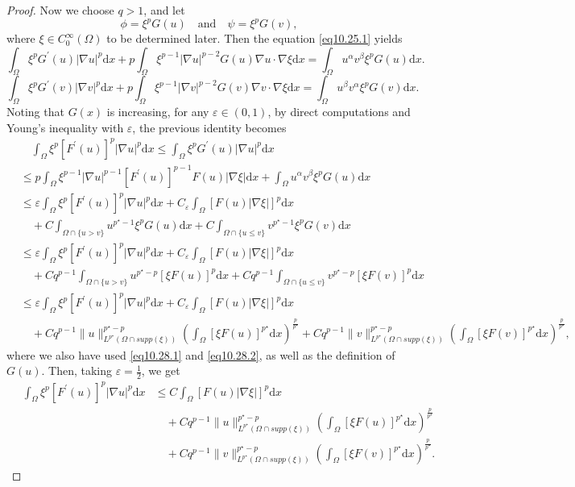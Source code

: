 \documentclass[12pt]{amsart}
\theoremstyle{definition}
\theoremstyle{remark}
\theoremstyle{conclusion}
\theoremstyle{conjecture}
\numberwithin{equation}{section}
\begin{document}
\begin{proof}
Now we choose $q>1$, %
and let
$$\phi=\xi^p G(u) \quad \text{and} \quad \psi=\xi^p G(v), $$
where $\xi \in C^\infty_0 (\Omega)$ to be determined later. Then the equation \eqref{eq10.25.1} yields
$$ \int_{\Omega} \xi^p G^\prime(u) |\nabla u|^p \mathrm{d}x + p\int_{\Omega} \xi^{p-1}| \nabla u|^{p-2} G(u) \nabla u \cdot \nabla \xi \mathrm{d}x = \int_{\Omega} u^{\alpha}v^{\beta} \xi^p G(u) \mathrm{d}x.$$
$$ \int_{\Omega} \xi^p G^\prime(v) |\nabla v|^p \mathrm{d}x + p\int_{\Omega} \xi^{p-1}| \nabla v|^{p-2} G(v) \nabla v \cdot \nabla \xi \mathrm{d}x = \int_{\Omega} u^{\beta}v^{\alpha} \xi^p G(v) \mathrm{d}x.$$
Noting that $G(x)$ is increasing, for any $\varepsilon\in(0,1)$, by direct computations and Young's inequality with $\varepsilon$, the previous identity becomes
\begin{align*}
&\quad \int_{\Omega} \xi^p [F^\prime(u)]^p |\nabla u|^p \mathrm{d}x \leq \int_{\Omega} \xi^p G^\prime(u) |\nabla u|^p \mathrm{d}x \\
&\leq p \int_{\Omega} \xi^{p-1}| \nabla u|^{p-1} [F^\prime(u)]^{p-1} F(u) |\nabla \xi| \mathrm{d}x + \int_{\Omega} u^{\alpha}v^{\beta} \xi^p G(u) \mathrm{d}x \\
&\leq \varepsilon \int_{\Omega} \xi^p [F^\prime(u)]^p |\nabla u|^p \mathrm{d}x + C_\varepsilon \int_{\Omega}  [F(u) |\nabla \xi|]^p \mathrm{d}x\\
&\quad + C \int_{\Omega \cap \{u> v\}} u^{p^{\star}-1} \xi^p G(u)\mathrm{d}x + C \int_{\Omega \cap \{u\leq v\}} v^{p^\star-1} \xi^p G(v) \mathrm{d}x\\
&\leq \varepsilon \int_{\Omega} \xi^p [F^\prime(u)]^p |\nabla u|^p \mathrm{d}x + C_\varepsilon \int_{\Omega}  [F(u) |\nabla \xi|]^p \mathrm{d}x\\
&\quad + Cq^{p-1} \int_{\Omega \cap \{u> v\}} u^{p^{\star}-p} [\xi F(u)]^p\mathrm{d}x + Cq^{p-1} \int_{\Omega \cap \{u\leq v\}} v^{p^\star-p}  [\xi F(v)]^p \mathrm{d}x\\
&\leq \varepsilon \int_{\Omega} \xi^p [F^\prime(u)]^p |\nabla u|^p \mathrm{d}x +  C_\varepsilon \int_{\Omega}  [F(u) |\nabla \xi|]^p \mathrm{d}x\\
&\quad+ Cq^{p-1}\|u\|_{L^{p^{\star}}(\Omega\cap supp(\xi))}^{p^{\star}-p}\left(\int_{\Omega} [\xi F(u)]^{p^{\star}} \mathrm{d}x\right)^\frac{p}{p^{\star}}+Cq^{p-1}\|v\|_{L^{p^{\star}}(\Omega\cap supp(\xi))}^{p^{\star}-p} \left(\int_{\Omega} [\xi F(v)]^{p^{\star}} \mathrm{d}x\right)^\frac{p}{p^{\star}},
\end{align*}
where we also have used \eqref{eq10.28.1} and \eqref{eq10.28.2}, as well as the definition of $G(u)$. Then, taking $\varepsilon=\frac{1}{2}$, we get
\begin{align*}
\quad \int_{\Omega} \xi^p  [F^\prime(u)]^p |\nabla u|^p \mathrm{d}x &\leq C \int_{\Omega}  [F(u) |\nabla \xi|]^p \mathrm{d}x\\
& \quad+ Cq^{p-1}\|u\|_{L^{p^{\star}}(\Omega\cap supp(\xi))}^{p^{\star}-p}\left(\int_{\Omega} [\xi F(u)]^{p^{\star}} \mathrm{d}x\right)^\frac{p}{p^{\star}}\\
& \quad+Cq^{p-1}\|v\|_{L^{p^{\star}}(\Omega\cap supp(\xi))}^{p^{\star}-p} \left(\int_{\Omega} [\xi F(v)]^{p^{\star}} \mathrm{d}x\right)^\frac{p}{p^{\star}} .
\end{align*}


\end{proof}
\end{document}
